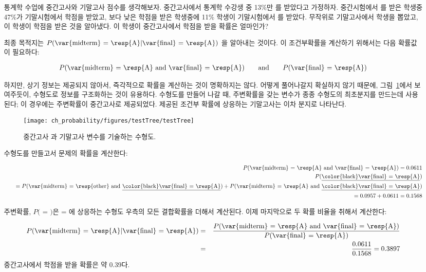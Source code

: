 \begin{example}{통계학 수업에 중간고사와 기말고사 점수를 생각해보자. 중간고사에서 통계학 수강생 중 13\%만 를 받았다고 가정하자. 중간시험에서 를 받은 학생중 47\%가 기말시험에서  학점을 받았고,  보다 낮은 학점을 받은 학생중에 11\% 학생이 기말시험에서 를 받았다. 무작위로 기말고사에서 학생을 뽑았고, 이 학생이  학점을 받은 것을 알아냈다. 이 학생이 중간고사에서  학점을 받을 확률은 얼마인가?} \label{exerciseForTreeDiagramOfStudentGettingAOnMidtermGivenThatSheGotAOnFinal}

최종 목적지는 $P(\text{\var{midterm} = \resp{A}} | \text{\var{final} = \resp{A}})$ 을 알아내는 것이다. 이 조건부확률을 계산하기 위해서는 다음 확률값이 필요하다:

\begin{eqnarray*}
P(\text{\var{midterm} = \resp{A} and \var{final} = \resp{A}}) \qquad\text{and}\qquad
P(\text{\var{final} = \resp{A}})
\end{eqnarray*}

하지만, 상기 정보는 제공되지 않아서, 즉각적으로 확률을 계산하는 것이 명확하지는 않다. 어떻게 풀어나갈지 확실하지 않기 때문에, 그림~\ref{testTree}에서 보여주듯이, 수형도로 정보를 구조화하는 것이 유용하다. 수형도를 만들어 나갈 때, 주변확률을 갖는 변수가 종종 수형도의 최초분지를 만드는데 사용된다; 이 경우에는 주변확률이 중간고사로 제공되었다. 제공된 조건부 확률에 상응하는 기말고사는 이차 분지로 나타난다.

\begin{figure}[ht]
\centering
\texttt{[image: ch\_probability/figures/testTree/testTree]}
\caption{중간고사  과 기말고사  변수를 기술하는 수형도.}
\label{testTree}
\end{figure}

수형도를 만들고서 문제의 확률을 계산한다:

\begin{eqnarray*}
&&P(\text{\var{midterm} = \resp{A} and \var{final} = \resp{A}}) = 0.0611 \\
&&P(\text{\underline{\color{black}\var{final} = \resp{A}}})  \\
&& \quad= P(\text{\var{midterm} = \resp{other} and \underline{\color{black}\var{final} = \resp{A}}}) + P(\text{\var{midterm} = \resp{A} and \underline{\color{black}\var{final} = \resp{A}}}) \\
&& \quad= 0.0957 + 0.0611  = 0.1568
\end{eqnarray*}

주변확률, $P($ = $)$은  = 에 상응하는 수형도 우측의 모든 결합확률을 더해서 계산된다.
이제 마지막으로 두 확률 비율을 취해서 계산한다:

\begin{eqnarray*}
P(\text{\var{midterm} = \resp{A}} | \text{\var{final} = \resp{A}}) &=& \frac{P(\text{\var{midterm} = \resp{A} and \var{final} = \resp{A}})}{P(\text{\var{final} = \resp{A}})} \\
&=& \frac{0.0611}{0.1568} = 0.3897
\end{eqnarray*}
중간고사에서  학점을 받을 확률은 약 0.39다.
\end{example}

